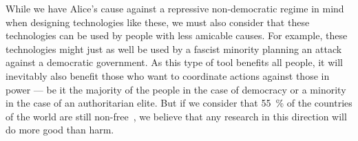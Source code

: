 While we have Alice's cause against a repressive non-democratic regime in mind 
when designing technologies like these, we must also consider that these 
technologies can be used by people with less amicable causes.
For example, these technologies might just as well be used by a fascist 
minority planning an attack against a democratic government.
As this type of tool benefits all people, it will inevitably also benefit those 
who want to coordinate actions against those in power --- be it the majority of 
the people in the case of democracy or a minority in the case of an 
authoritarian elite.
But if we consider that \SI{55}{\%} of the countries of the world are still 
non-free~\cite{FreedomInTheWorld2017}, we believe that any research in this 
direction will do more good than harm.

